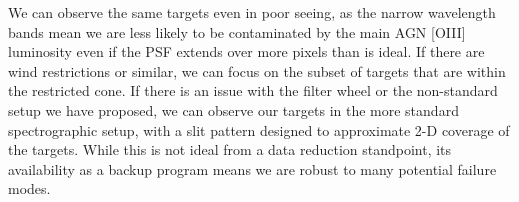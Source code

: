 \documentclass[12pt]{article}
\begin{document}

\vspace{0.25em}
We can observe the same targets even in poor seeing, as the narrow wavelength bands mean we are less likely to be contaminated by the main AGN [OIII] luminosity even if the PSF extends over more pixels than is ideal. If there are wind restrictions or similar, we can focus on the subset of targets that are within the restricted cone. If there is an issue with the filter wheel or the non-standard setup we have proposed, we can observe our targets in the more standard spectrographic setup, with a slit pattern designed to approximate 2-D coverage of the targets. While this is not ideal from a data reduction standpoint, its availability as a backup program means we are robust to many potential failure modes. 
\vspace{1.5em}
\end{document}
